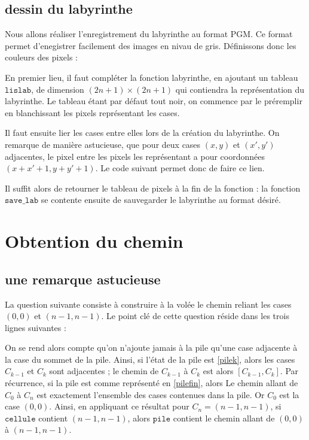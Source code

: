 \documentclass[11pt,a4paper]{article}
\begin{document}
\subsection{dessin du labyrinthe}

Nous allons réaliser l'enregistrement du labyrinthe au format PGM. Ce format permet d'enegistrer facilement des images en nivau de gris. Définissons donc les couleurs des pixels :



\par
En premier lieu, il faut compléter la fonction labyrinthe, en ajoutant un tableau $\mathtt{lislab}$, de dimension $(2n+1) \times (2n+1)$ qui contiendra la représentation du labyrinthe. Le tableau étant par défaut tout noir, on commence par le préremplir en blanchissant les pixels représentant les cases.



Il faut ensuite lier les cases entre elles lors de la création du labyrinthe. On remarque de manière astucieuse, que pour deux cases $(x,y)$ et $(x',y')$ adjacentes, le pixel entre les pixels les représentant a pour coordonnées $(x+x'+1,y+y'+1)$. Le code suivant permet donc de faire ce lien.



Il suffit alors de retourner le tableau de pixels à la fin de la fonction : la fonction $\mathtt{save\_lab}$ se contente ensuite de sauvegarder le labyrinthe au format désiré.




\section{Obtention du chemin}

\subsection{une remarque astucieuse}
La question suivante consiste à construire à la volée le chemin reliant les cases $(0,0)$ et $(n-1,n-1)$.  Le point clé de cette question réside dans les trois lignes suivantes :

On se rend alors compte qu'on n'ajoute jamais à la pile qu'une case adjacente à la case du sommet de la pile. Ainsi, si l'état de la pile est \ref{pilek}, alors les cases $C_{k-1}$ et $C_{k}$ sont adjacentes ; le chemin de $C_{k-1}$ à $C_{k}$ est alors $[C_{k-1},C_{k}]$. Par récurrence, si la pile est comme représenté en \ref{pilefin}, alors Le chemin allant de $C_0$ à $C_n$ est exactement l'ensemble des cases contenues dans la pile. Or $C_0$ est la case $(0,0)$. Ainsi, en appliquant ce résultat pour $C_n = (n-1,n-1)$, si $\mathtt{cellule}$ contient $(n-1,n-1)$, alors $\mathtt{pile}$ contient le chemin allant de $(0,0)$ à $(n-1,n-1)$.
\end{document}
